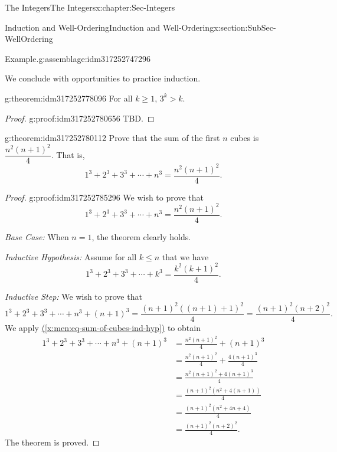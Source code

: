 \documentclass[oneside,10pt,]{book}
\newcommand{\xreffont}{\relax}
\numberwithin{equation}{section}
\renewcommand{\le}{\leqslant}
\renewcommand{\ge}{\geqslant}
\newcommand{\amp}{&}
\begin{document}
\begin{chapterptx}{The Integers}{}{The Integers}{}{}{x:chapter:Sec-Integers}
\begin{sectionptx}{Induction and Well-Ordering}{}{Induction and Well-Ordering}{}{}{x:section:SubSec-WellOrdering}
\begin{assemblage}{Example.}{g:assemblage:idm317252747296}
\end{assemblage}
We conclude with opportunities to practice induction.%
\begin{theorem}{}{}{g:theorem:idm317252778096}%
For all \(k\ge 1\), \(3^k > k\).%
\end{theorem}
\begin{proof}{}{g:proof:idm317252780656}
TBD.%
\end{proof}
\begin{theorem}{}{}{g:theorem:idm317252780112}%
Prove that the sum of the first \(n\) cubes is \(\dfrac{n^2(n+1)^2}{4}\). That is,%
%
\begin{equation*}
1^3 + 2^3 + 3^3 + \cdots + n^3 = \dfrac{n^2(n+1)^2}{4}.
\end{equation*}
\end{theorem}
\begin{proof}{}{g:proof:idm317252785296}
We wish to prove that%
\begin{equation*}
1^3 + 2^3 + 3^3 + \cdots + n^3 = \frac{n^2(n+1)^2}{4}.
\end{equation*}
%
\par
\emph{Base Case:} When \(n=1\), the theorem clearly holds.%
\par
\emph{Inductive Hypothesis:} Assume for all \(k\le n\) that we have%
\begin{equation}
1^3 + 2^3 + 3^3 + \cdots + k^3 = \frac{k^2(k+1)^2}{4}.\label{x:men:eq-sum-of-cubes-ind-hyp}
\end{equation}
%
\par
\emph{Inductive Step:} We wish to prove that%
\begin{equation*}
1^3 + 2^3 + 3^3 + \cdots + n^3 +(n+1)^3 = \frac{(n+1)^2((n+1)+1)^2}{4} = \frac{(n+1)^2(n+2)^2}{4}.
\end{equation*}
We apply \hyperref[x:men:eq-sum-of-cubes-ind-hyp]{({\xreffont\ref{x:men:eq-sum-of-cubes-ind-hyp}})} to obtain%
\begin{align*}
1^3 + 2^3 + 3^3 + \cdots + n^3 +(n+1)^3 \amp = \frac{n^2(n+1)^2}{4} + (n+1)^3 \\
\amp = \frac{n^2(n+1)^2}{4} + \frac{4(n+1)^3}{4}\\
\amp = \frac{n^2(n+1)^2 + 4(n+1)^3}{4}\\
\amp = \frac{(n+1)^2 (n^2+4(n+1))}{4}\\
\amp = \frac{(n+1)^2 (n^2+4n+4)}{4}\\
\amp = \frac{(n+1)^2 (n+2)^2}{4}.
\end{align*}
The theorem is proved.%
\end{proof}

\end{sectionptx}
\end{chapterptx}
\end{document}
